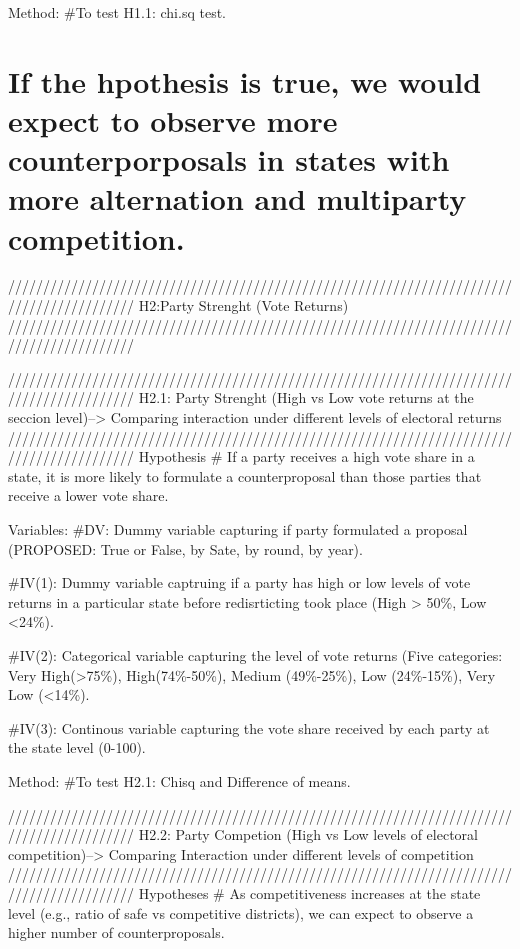 \documentclass[]{article}
\begin{document}
Method: \#To test H1.1: chi.sq test.

\hypertarget{if-the-hpothesis-is-true-we-would-expect-to-observe-more-counterporposals-in-states-with-more-alternation-and-multiparty-competition.}{%
\section{If the hpothesis is true, we would expect to observe more
counterporposals in states with more alternation and multiparty
competition.}\label{if-the-hpothesis-is-true-we-would-expect-to-observe-more-counterporposals-in-states-with-more-alternation-and-multiparty-competition.}}

//////////////////////////////////////////////////////////////////////////////////////////
H2:Party Strenght (Vote Returns)
//////////////////////////////////////////////////////////////////////////////////////////

//////////////////////////////////////////////////////////////////////////////////////////
H2.1: Party Strenght (High vs Low vote returns at the seccion
level)--\textgreater{} Comparing interaction under different levels of
electoral returns
//////////////////////////////////////////////////////////////////////////////////////////
Hypothesis \# If a party receives a high vote share in a state, it is
more likely to formulate a counterproposal than those parties that
receive a lower vote share.

Variables: \#DV: Dummy variable capturing if party formulated a proposal
(PROPOSED: True or False, by Sate, by round, by year).

\#IV(1): Dummy variable captruing if a party has high or low levels of
vote returns in a particular state before redisrticting took place (High
\textgreater{} 50\%, Low \textless{}24\%).

\#IV(2): Categorical variable capturing the level of vote returns (Five
categories: Very High(\textgreater{}75\%), High(74\%-50\%), Medium
(49\%-25\%), Low (24\%-15\%), Very Low (\textless{}14\%).

\#IV(3): Continous variable capturing the vote share received by each
party at the state level (0-100).

Method: \#To test H2.1: Chisq and Difference of means.

//////////////////////////////////////////////////////////////////////////////////////////
H2.2: Party Competion (High vs Low levels of electoral
competition)--\textgreater{} Comparing Interaction under different
levels of competition
//////////////////////////////////////////////////////////////////////////////////////////
Hypotheses \# As competitiveness increases at the state level (e.g.,
ratio of safe vs competitive districts), we can expect to observe a
higher number of counterproposals.
\end{document}
